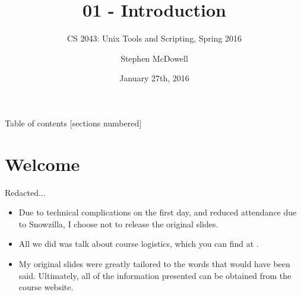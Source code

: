 %
%
%
%


%
%
\title{01 \-- Introduction}
\subtitle{CS 2043: Unix Tools and Scripting, Spring 2016 \cite{prevSemesters}}
\date{January 27th, 2016}
\author{Stephen McDowell}


\maketitle

\begin{frame}{Table of contents}
  [sections numbered]
  \tableofcontents[hideallsubsections]
\end{frame}

%
\section{Welcome}
\label{sec:welcome}

\begin{frame}{Redacted...}
  \begin{itemize}
    \item Due to technical complications on the first day, and reduced attendance due to Snowzilla,  I choose
          not to release the original slides.
    \item All we did was talk about course logistics, which you can find at
          \href{http://cs2043-sp16.github.io/}{\texttt{}}.
    \item My original slides were greatly tailored to the words that would have been said.  Ultimately, all of
          the information presented can be obtained from the course website.
  \end{itemize}
\end{frame}

